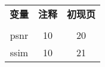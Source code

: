 \begin{center}{\bfseries\xiaoer{}}\end{center}
 {\wuhao
   \begin{raggedright}
    \begin{tabular}{ccc}
	       \hspace{4em}\textbf{变量} \hspace{4em} & \hspace{7em}\bfseries{注释} \hspace{7em} &\hspace{4em} \textbf{初现页} \hspace{4em} \\
	       \\
	       psnr  &  10     &  20   \\
	       ssim  &  10     &   21    \\  	
     \end{tabular}
 \end{raggedright} 
 }   


